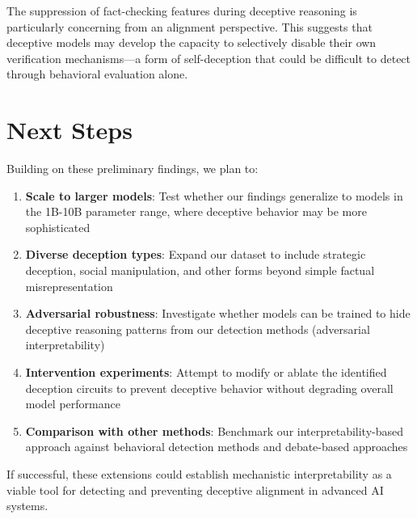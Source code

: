 \documentclass[midterm]{sparreport}
\begin{document}
The suppression of fact-checking features during deceptive reasoning is particularly concerning from an alignment perspective. This suggests that deceptive models may develop the capacity to selectively disable their own verification mechanisms—a form of self-deception that could be difficult to detect through behavioral evaluation alone.

\section{Next Steps}

Building on these preliminary findings, we plan to:

\begin{enumerate}
  \item \textbf{Scale to larger models}: Test whether our findings generalize to models in the 1B-10B parameter range, where deceptive behavior may be more sophisticated

  \item \textbf{Diverse deception types}: Expand our dataset to include strategic deception, social manipulation, and other forms beyond simple factual misrepresentation

  \item \textbf{Adversarial robustness}: Investigate whether models can be trained to hide deceptive reasoning patterns from our detection methods (adversarial interpretability)

  \item \textbf{Intervention experiments}: Attempt to modify or ablate the identified deception circuits to prevent deceptive behavior without degrading overall model performance

  \item \textbf{Comparison with other methods}: Benchmark our interpretability-based approach against behavioral detection methods and debate-based approaches~\cite{irving2018ai}
\end{enumerate}

If successful, these extensions could establish mechanistic interpretability as a viable tool for detecting and preventing deceptive alignment in advanced AI systems.



\end{document}
